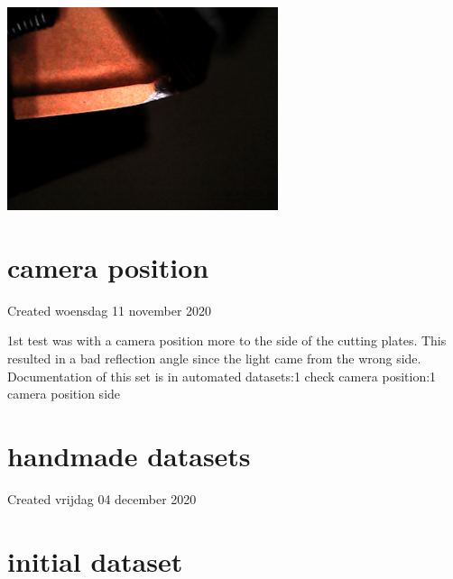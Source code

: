 \documentclass{article}
\begin{document}
\includegraphics[width=3.125000in, keepaspectratio=true]{./ZimFiles_files/Vision/Dataset/automated_datasets/2_created_datasets/2_Spaghetti_dataset/rounded_gold_b_015_p_006_l_006-011_white_nb.png}




































		\section{camera position}

Created woensdag 11 november 2020



1st test was with a camera position more to the side of the cutting plates. This resulted in a bad reflection angle since the light came from the wrong side. Documentation of this set is in automated datasets:1 check camera position:1 camera position side


		\section{handmade datasets}

Created vrijdag 04 december 2020




		\section{initial dataset}
\end{document}
